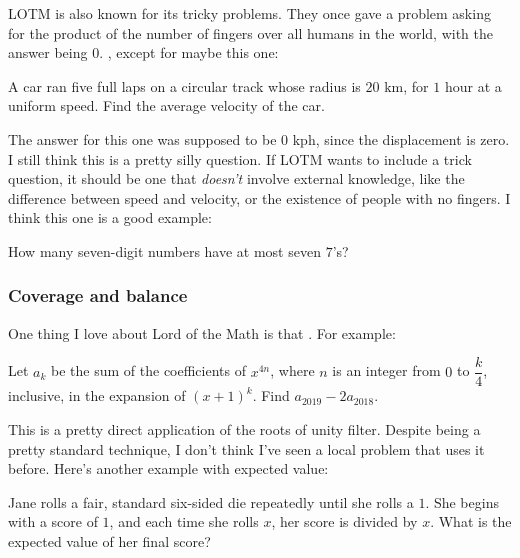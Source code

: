 \documentclass[11pt,paper=letter]{scrartcl}
\begin{document}
LOTM is also known for its tricky problems. They once gave a problem asking for the product of the number of fingers over all humans in the world, with the answer being $0$. , except for maybe this one:

\begin{probboxed}
   A car ran five full laps on a circular track whose radius is $20\text{ km}$, for $1$ hour at a uniform speed. Find the average velocity of the car.
\end{probboxed}

The answer for this one was supposed to be $0\text{ kph}$, since the displacement is zero. I still think this is a pretty silly question. If LOTM wants to include a trick question, it should be one that \emph{doesn't} involve external knowledge, like the difference between speed and velocity, or the existence of people with no fingers. I think this one is a good example:

\begin{probboxed}
   How many seven-digit numbers have at most seven $7$'s?
\end{probboxed}

\subsubsection*{Coverage and balance}

One thing I love about Lord of the Math is that . For example:

\begin{probboxed}
   Let $a_k$ be the sum of the coefficients of $x^{4n}$, where $n$ is an integer from $0$ to $\dfrac k4$, inclusive, in the expansion of $(x + 1)^k$. Find $a_{2019} - 2a_{2018}$.
\end{probboxed}

This is a pretty direct application of the roots of unity filter. Despite being a pretty standard technique, I don't think I've seen a local problem that uses it before. Here's another example with expected value:

\begin{probboxed}
   Jane rolls a fair, standard six-sided die repeatedly until she rolls a $1$. She begins with a score of $1$, and each time she rolls $x$, her score is divided by $x$. What is the expected value of her final score?
\end{probboxed}
\end{document}
